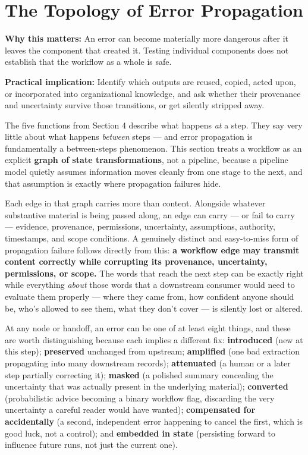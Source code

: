 \section{The Topology of Error Propagation}

\textbf{Why this matters:} An error can become materially more dangerous after it leaves the component that created it. Testing individual components does not establish that the workflow as a whole is safe.

\textbf{Practical implication:} Identify which outputs are reused, copied, acted upon, or incorporated into organizational knowledge, and ask whether their provenance and uncertainty survive those transitions, or get silently stripped away.

The five functions from Section 4 describe what happens \emph{at} a step. They say very little about what happens \emph{between} steps --- and error propagation is fundamentally a between-steps phenomenon. This section treats a workflow as an explicit \textbf{graph of state transformations}, not a pipeline, because a pipeline model quietly assumes information moves cleanly from one stage to the next, and that assumption is exactly where propagation failures hide.

Each edge in that graph carries more than content. Alongside whatever substantive material is being passed along, an edge can carry --- or fail to carry --- evidence, provenance, permissions, uncertainty, assumptions, authority, timestamps, and scope conditions. A genuinely distinct and easy-to-miss form of propagation failure follows directly from this: \textbf{a workflow edge may transmit content correctly while corrupting its provenance, uncertainty, permissions, or scope.} The words that reach the next step can be exactly right while everything \emph{about} those words that a downstream consumer would need to evaluate them properly --- where they came from, how confident anyone should be, who's allowed to see them, what they don't cover --- is silently lost or altered.

At any node or handoff, an error can be one of at least eight things, and these are worth distinguishing because each implies a different fix: \textbf{introduced} (new at this step); \textbf{preserved} unchanged from upstream; \textbf{amplified} (one bad extraction propagating into many downstream records); \textbf{attenuated} (a human or a later step partially correcting it); \textbf{masked} (a polished summary concealing the uncertainty that was actually present in the underlying material); \textbf{converted} (probabilistic advice becoming a binary workflow flag, discarding the very uncertainty a careful reader would have wanted); \textbf{compensated for accidentally} (a second, independent error happening to cancel the first, which is good luck, not a control); and \textbf{embedded in state} (persisting forward to influence future runs, not just the current one).

